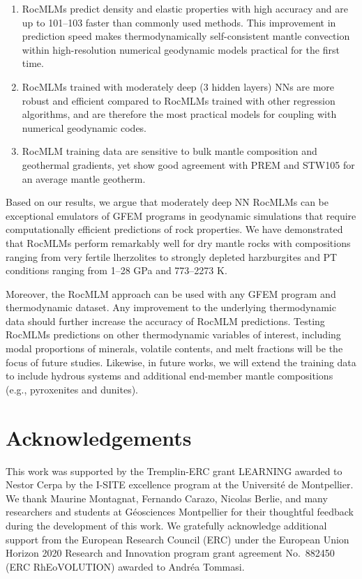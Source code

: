 \documentclass[draft,linenumbers]{agujournal2018}
\providecommand{\tightlist}{%
  \setlength{\itemsep}{0pt}\setlength{\parskip}{0pt}}
\providecommand{\tightlist}{\setlength{\itemsep}{0pt}\setlength{\parskip}{0pt}}
\def\tightlist{}
\begin{document}
\begin{enumerate}
\def\labelenumi{\arabic{enumi}.}
\tightlist
\item
  RocMLMs predict density and elastic properties with high accuracy and are up to 101--103 faster than commonly used methods. This improvement in prediction speed makes thermodynamically self-consistent mantle convection within high-resolution numerical geodynamic models practical for the first time.
\item
  RocMLMs trained with moderately deep (3 hidden layers) NNs are more robust and efficient compared to RocMLMs trained with other regression algorithms, and are therefore the most practical models for coupling with numerical geodynamic codes.
\item
  RocMLM training data are sensitive to bulk mantle composition and geothermal gradients, yet show good agreement with PREM and STW105 for an average mantle geotherm.
\end{enumerate}

Based on our results, we argue that moderately deep NN RocMLMs can be exceptional emulators of GFEM programs in geodynamic simulations that require computationally efficient predictions of rock properties. We have demonstrated that RocMLMs perform remarkably well for dry mantle rocks with compositions ranging from very fertile lherzolites to strongly depleted harzburgites and PT conditions ranging from 1--28 GPa and 773--2273 K.

Moreover, the RocMLM approach can be used with any GFEM program and thermodynamic dataset. Any improvement to the underlying thermodynamic data should further increase the accuracy of RocMLM predictions. Testing RocMLMs predictions on other thermodynamic variables of interest, including modal proportions of minerals, volatile contents, and melt fractions will be the focus of future studies. Likewise, in future works, we will extend the training data to include hydrous systems and additional end-member mantle compositions (e.g., pyroxenites and dunites).

\section{Acknowledgements}\label{acknowledgements}

This work was supported by the Tremplin-ERC grant LEARNING awarded to Nestor Cerpa by the I-SITE excellence program at the Université de Montpellier. We thank Maurine Montagnat, Fernando Carazo, Nicolas Berlie, and many researchers and students at Géosciences Montpellier for their thoughtful feedback during the development of this work. We gratefully acknowledge additional support from the European Research Council (ERC) under the European Union Horizon 2020 Research and Innovation program grant agreement No.~882450 (ERC RhEoVOLUTION) awarded to Andréa Tommasi.
\end{document}
